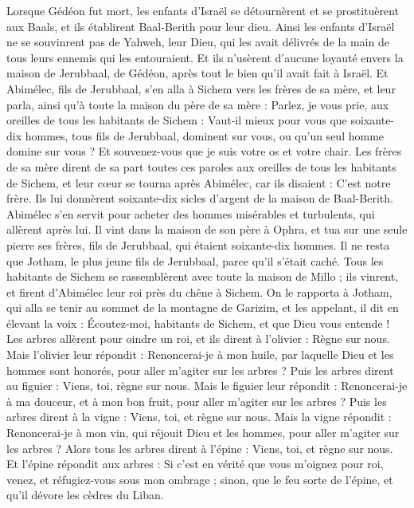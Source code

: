 \begin{multicols}{2}
Lorsque Gédéon fut mort, les enfants d'Israël se détournèrent et se prostituèrent aux Baals, et ils établirent Baal-Berith pour leur dieu.
Ainsi les enfants d'Israël ne se souvinrent pas de Yahweh, leur Dieu, qui les avait délivrés de la main de tous leurs ennemis qui les entouraient.
Et ils n'usèrent d'aucune loyauté envers la maison de Jerubbaal, de Gédéon, après tout le bien qu'il avait fait à Israël.
\VerseOne{}Et Abimélec, fils de Jerubbaal, s'en alla à Sichem vers les frères de sa mère, et leur parla, ainsi qu'à toute la maison du père de sa mère :
Parlez, je vous prie, aux oreilles de tous les habitants de Sichem : Vaut-il mieux pour vous que soixante-dix hommes, tous fils de Jerubbaal, dominent sur vous, ou qu'un seul homme domine sur vous ? Et souvenez-vous que je suis votre os et votre chair.
Les frères de sa mère dirent de sa part toutes ces paroles aux oreilles de tous les habitants de Sichem, et leur cœur se tourna après Abimélec, car ils disaient : C'est notre frère.
Ils lui donnèrent soixante-dix sicles d'argent de la maison de Baal-Berith. Abimélec s'en servit pour acheter des hommes misérables et turbulents, qui allèrent après lui.
Il vint dans la maison de son père à Ophra, et tua sur une seule pierre ses frères, fils de Jerubbaal, qui étaient soixante-dix hommes. Il ne resta que Jotham, le plus jeune fils de Jerubbaal, parce qu'il s'était caché.
Tous les habitants de Sichem se rassemblèrent avec toute la maison de Millo ; ils vinrent, et firent d'Abimélec leur roi près du chêne à Sichem.
On le rapporta à Jotham, qui alla se tenir au sommet de la montagne de Garizim, et les appelant, il dit en élevant la voix : Écoutez-moi, habitants de Sichem, et que Dieu vous entende !
Les arbres allèrent pour oindre un roi, et ils dirent à l'olivier : Règne sur nous.
Mais l'olivier leur répondit : Renoncerai-je à mon huile, par laquelle Dieu et les hommes sont honorés, pour aller m'agiter sur les arbres ?
Puis les arbres dirent au figuier : Viens, toi, règne sur nous.
Mais le figuier leur répondit : Renoncerai-je à ma douceur, et à mon bon fruit, pour aller m'agiter sur les arbres ?
Puis les arbres dirent à la vigne : Viens, toi, et règne sur nous.
Mais la vigne répondit : Renoncerai-je à mon vin, qui réjouit Dieu et les hommes, pour aller m'agiter sur les arbres ?
Alors tous les arbres dirent à l'épine : Viens, toi, et règne sur nous.
Et l'épine répondit aux arbres : Si c'est en vérité que vous m'oignez pour roi, venez, et réfugiez-vous sous mon ombrage ; sinon, que le feu sorte de l'épine, et qu'il dévore les cèdres du Liban.

\end{multicols}
